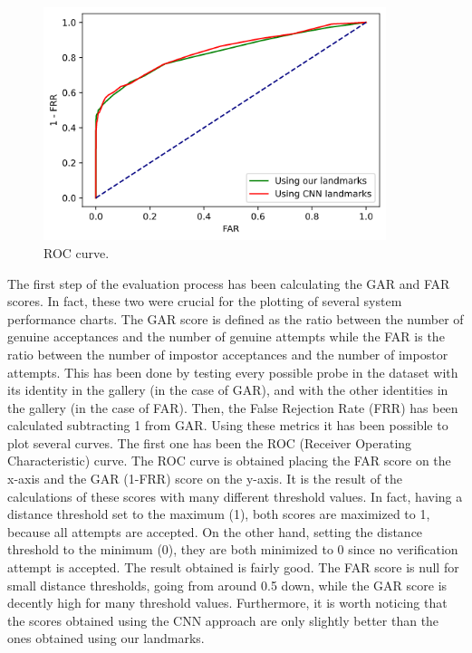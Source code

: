\documentclass{article}
\begin{document}
\begin{figure}[H]
    \label{fig:roc}
    \begin{center}
        \includegraphics[width=10cm,keepaspectratio]{images/roc_updated.png}
        \caption{ROC curve.}
    \end{center}
\end{figure}

The first step of the evaluation process has been calculating the GAR and FAR scores. 
In fact, these two were crucial for the plotting of several system performance charts. 
The GAR score is defined as the ratio between the number of genuine acceptances and the 
number of genuine attempts while the FAR is the ratio between the number of impostor 
acceptances and the number of impostor attempts.
This has been done by testing every possible probe in the dataset with its identity in the gallery
(in the case of GAR), and with the other identities in the gallery (in the case of FAR).
Then, the False Rejection Rate (FRR) has been calculated subtracting 1 from GAR.
Using these metrics it has been possible to plot several curves. The first one has been 
the ROC (Receiver Operating 
Characteristic) curve. The ROC curve is obtained placing the FAR score on the x-axis and
 the GAR (1-FRR) score on the y-axis.
It is the result of the calculations of these scores with many different threshold values. 
In fact, having a distance threshold set to the maximum (1), both scores are maximized to 1, 
because all attempts are accepted. On the other hand, setting the distance threshold to the 
minimum (0), they are both minimized to 0 since no verification attempt is accepted.
The result obtained is fairly good. The FAR score is null for small distance thresholds,
going from around 0.5 down, while the GAR score is decently high for many threshold values.
Furthermore, it is worth noticing that the scores obtained using the CNN approach are only
slightly better than the ones obtained using our landmarks. 
\end{document}
